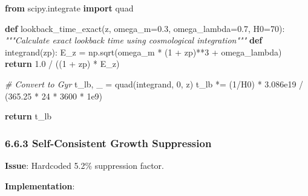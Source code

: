\documentclass[
  11pt,
]{report}
\newenvironment{Shaded}{}{}
\newcommand{\CommentTok}[1]{\textcolor[rgb]{0.38,0.63,0.69}{\textit{#1}}}
\newcommand{\ControlFlowTok}[1]{\textcolor[rgb]{0.00,0.44,0.13}{\textbf{#1}}}
\newcommand{\DecValTok}[1]{\textcolor[rgb]{0.25,0.63,0.44}{#1}}
\newcommand{\FloatTok}[1]{\textcolor[rgb]{0.25,0.63,0.44}{#1}}
\newcommand{\ImportTok}[1]{\textcolor[rgb]{0.00,0.50,0.00}{\textbf{#1}}}
\newcommand{\KeywordTok}[1]{\textcolor[rgb]{0.00,0.44,0.13}{\textbf{#1}}}
\newcommand{\NormalTok}[1]{#1}
\newcommand{\OperatorTok}[1]{\textcolor[rgb]{0.40,0.40,0.40}{#1}}
\begin{document}
\begin{Shaded}
\begin{Highlighting}[]
\ImportTok{from}\NormalTok{ scipy.integrate }\ImportTok{import}\NormalTok{ quad}

\KeywordTok{def}\NormalTok{ lookback\_time\_exact(z, omega\_m}\OperatorTok{=}\FloatTok{0.3}\NormalTok{, omega\_lambda}\OperatorTok{=}\FloatTok{0.7}\NormalTok{, H0}\OperatorTok{=}\DecValTok{70}\NormalTok{):}
    \CommentTok{"""Calculate exact lookback time using cosmological integration"""}
    \KeywordTok{def}\NormalTok{ integrand(zp):}
\NormalTok{        E\_z }\OperatorTok{=}\NormalTok{ np.sqrt(omega\_m }\OperatorTok{*}\NormalTok{ (}\DecValTok{1} \OperatorTok{+}\NormalTok{ zp)}\OperatorTok{**}\DecValTok{3} \OperatorTok{+}\NormalTok{ omega\_lambda)}
        \ControlFlowTok{return} \FloatTok{1.0} \OperatorTok{/}\NormalTok{ ((}\DecValTok{1} \OperatorTok{+}\NormalTok{ zp) }\OperatorTok{*}\NormalTok{ E\_z)}
    
    \CommentTok{\# Convert to Gyr}
\NormalTok{    t\_lb, \_ }\OperatorTok{=}\NormalTok{ quad(integrand, }\DecValTok{0}\NormalTok{, z)}
\NormalTok{    t\_lb }\OperatorTok{*=}\NormalTok{ (}\DecValTok{1}\OperatorTok{/}\NormalTok{H0) }\OperatorTok{*} \FloatTok{3.086e19} \OperatorTok{/}\NormalTok{ (}\FloatTok{365.25} \OperatorTok{*} \DecValTok{24} \OperatorTok{*} \DecValTok{3600} \OperatorTok{*} \FloatTok{1e9}\NormalTok{)}
    
    \ControlFlowTok{return}\NormalTok{ t\_lb}
\end{Highlighting}
\end{Shaded}

\subsubsection{6.6.3 Self-Consistent Growth
Suppression}\label{self-consistent-growth-suppression}

\textbf{Issue}: Hardcoded 5.2\% suppression factor.

\textbf{Implementation}:
\end{document}
